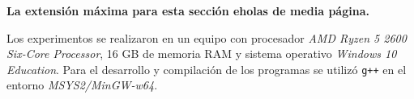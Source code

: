 \begin{mdframed}
    \textbf{La extensión máxima para esta sección eholas de media página.}
\end{mdframed}

Los experimentos se realizaron en un equipo con procesador \textit{AMD Ryzen 5 2600 Six-Core Processor}, 16 GB de memoria RAM y sistema operativo \textit{Windows 10 Education}. Para el desarrollo y compilación de los programas se utilizó \texttt{g++} en el entorno \textit{MSYS2/MinGW-w64}. 
